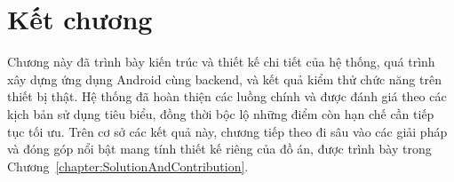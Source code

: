 \documentclass[../DoAn.tex]{subfiles}
\begin{document}
\FloatBarrier
\section*{Kết chương}
Chương này đã trình bày kiến trúc và thiết kế chi tiết của hệ thống, quá trình xây dựng ứng dụng Android cùng backend, và kết quả kiểm thử chức năng trên thiết bị thật. Hệ thống đã hoàn thiện các luồng chính và được đánh giá theo các kịch bản sử dụng tiêu biểu, đồng thời bộc lộ những điểm còn hạn chế cần tiếp tục tối ưu. Trên cơ sở các kết quả này, chương tiếp theo đi sâu vào các giải pháp và đóng góp nổi bật mang tính thiết kế riêng của đồ án, được trình bày trong Chương~\ref{chapter:SolutionAndContribution}.
\end{document}
